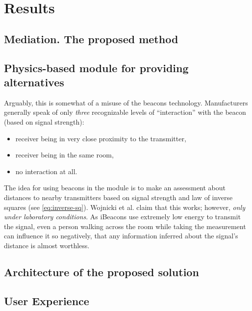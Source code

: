 \chapter{Results}
\label{cha:results}

\section{Mediation. The proposed method}
\label{sec:mediation}

\section{Physics-based module for providing alternatives}
\label{sec:physics-module}


 Arguably, this is somewhat of a misuse of the beacons technology. Manufacturers generally speak of only \emph{three} recognizable levels of ``interaction'' with the beacon (based on signal strength): \begin{itemize}
 	\item receiver being in very close proximity to the transmitter,
 	\item receiver being in the same room,
 	\item no interaction at all.
 \end{itemize}
 
The idea for using beacons in the module is to make an assessment about distances to nearby transmitters based on signal strength and law of inverse squares (see \cref{eq:inverse-sq}). Wojnicki et al. claim that this works; however, \emph{only under laboratory conditions}.  As iBeacons use extremely low energy to transmit the signal, even a person walking across the room while taking the measurement can influence it so negatively, that any information inferred about the signal's distance is almost worthless.

\section{Architecture of the proposed solution}


\section{User Experience}
\label{sec:user-experience}
